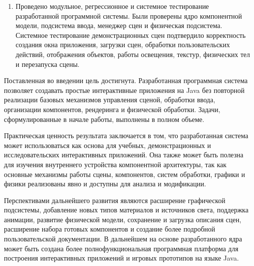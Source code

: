 \begin{enumerate}
\item Проведено модульное, регрессионное и системное тестирование разработанной
программной системы. Были проверены ядро компонентной модели, подсистема
ввода, менеджер сцен и физическая подсистема. Системное тестирование
демонстрационных сцен подтвердило корректность создания окна приложения,
загрузки сцен, обработки пользовательских действий, отображения объектов,
работы освещения, текстур, физических тел и перезапуска сцены.
\end{enumerate}

Поставленная во введении цель достигнута. Разработанная программная система
позволяет создавать простые интерактивные приложения на Java без повторной
реализации базовых механизмов управления сценой, обработки ввода, организации
компонентов, рендеринга и физической обработки. Задачи, сформулированные в
начале работы, выполнены в полном объеме.

Практическая ценность результата заключается в том, что разработанная система
может использоваться как основа для учебных, демонстрационных и
исследовательских интерактивных приложений. Она также может быть полезна для
изучения внутреннего устройства компонентной архитектуры, так как основные
механизмы работы сцены, компонентов, систем обработки, графики и физики
реализованы явно и доступны для анализа и модификации.

Перспективами дальнейшего развития являются расширение графической
подсистемы, добавление новых типов материалов и источников света, поддержка
анимации, развитие физической модели, сохранение и загрузка описания сцен,
расширение набора готовых компонентов и создание более подробной
пользовательской документации. В дальнейшем на основе разработанного ядра
может быть создана более полнофункциональная программная платформа для
построения интерактивных приложений и игровых прототипов на языке Java.
